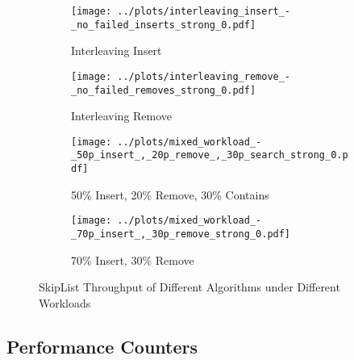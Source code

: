 \begin{figure}[H]
    \centering
    
    \begin{subfigure}[b]{0.49\textwidth}
        \texttt{[image: ../plots/interleaving\_insert\_-\_no\_failed\_inserts\_strong\_0.pdf]}
        \caption{Interleaving Insert}
        \label{fig:Scatter:OpenMPI:Rel:31}
    \end{subfigure}
    \begin{subfigure}[b]{0.49\textwidth}
        \texttt{[image: ../plots/interleaving\_remove\_-\_no\_failed\_removes\_strong\_0.pdf]}
        \caption{Interleaving Remove}
        \label{fig:Scatter:OpenMPI:Abs:31}
    \end{subfigure}
    
    \begin{subfigure}[b]{0.49\textwidth}
        \texttt{[image: ../plots/mixed\_workload\_-\_50p\_insert\_,\_20p\_remove\_,\_30p\_search\_strong\_0.pdf]}
        \caption{50\% Insert, 20\% Remove, 30\% Contains}
        \label{fig:Scatter:OpenMPI:Rel:32}
    \end{subfigure}
    \begin{subfigure}[b]{0.49\textwidth}
        \texttt{[image: ../plots/mixed\_workload\_-\_70p\_insert\_,\_30p\_remove\_strong\_0.pdf]}
        \caption{70\% Insert, 30\% Remove}
        \label{fig:Scatter:OpenMPI:Abs:32}
    \end{subfigure}
    
    \caption{SkipList Throughput of Different Algorithms under Different Workloads}
\end{figure}


\subsection{Performance Counters}

